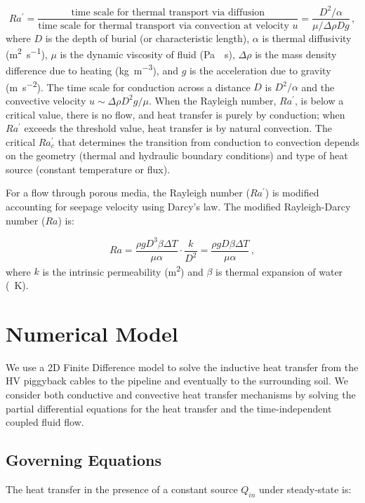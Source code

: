 \documentclass[Journal,letterpaper,InsideFigs]{ascelike-new}
\begin{document}
\begin{equation}
Ra^\prime = \frac{\text{time scale for thermal transport via diffusion}}{\text{time scale for thermal transport via convection at velocity }u} = \frac{D^2/\alpha}{\mu/\Delta \rho D g} \,,
\label{eq:ra-text}
\end{equation}
\noindent where $D$ is the depth of burial (or characteristic length), $\alpha$ is thermal diffusivity (\si{\meter\squared\per\second}), $\mu$ is the dynamic viscosity of fluid (\si{\pascal\cdot\second}), $\Delta \rho$ is the mass density difference due to heating (\si{\kilogram\per\meter\cubed}), and $g$ is the acceleration due to gravity (\si{\meter\per\second\squared}). The time scale for conduction across a distance $D$ is $D^2/\alpha$ and the convective velocity $u \sim \Delta \rho D^2 g / \mu$. When the Rayleigh number, $Ra^\prime$, is below a critical value, there is no flow, and heat transfer is purely by conduction; when $Ra^\prime$ exceeds the threshold value, heat transfer is by natural convection. The critical $Ra_c^\prime$ that determines the transition from conduction to convection depends on the geometry (thermal and hydraulic boundary conditions) and type of heat source (constant temperature or flux). 

For a flow through porous media, the Rayleigh number ($Ra^\prime$) is modified accounting for seepage velocity using Darcy's law. The modified Rayleigh-Darcy number ($Ra$) is:

\begin{equation}
Ra = \frac{\rho g D^3 \beta \Delta T}{\mu \alpha} \cdot \frac{k}{D^2} = \frac{\rho g D \beta \Delta T}{\mu \alpha}\,,
\label{eq:ra}
\end{equation}
where $k$ is the intrinsic permeability (\si{\meter\squared}) and $\beta$ is thermal expansion of water (\si{\per\kelvin}). 

\section{Numerical Model}
We use a 2D Finite Difference model to solve the inductive heat transfer from the HV piggyback cables to the pipeline and eventually to the surrounding soil. We consider both conductive and convective heat transfer mechanisms by solving the partial differential equations for the heat transfer and the time-independent coupled fluid flow. 

\subsection*{Governing Equations} 
The heat transfer in the presence of a constant source $Q_{in}$ under steady-state is: 
\end{document}
